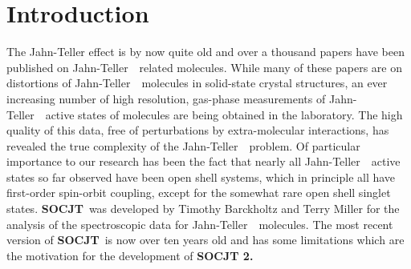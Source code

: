 \documentclass{article}
\newcommand{\JT}{Jahn-Teller\ }
\newcommand{\socjttwo}{\bf{SOCJT 2}}
\newcommand{\socjt}{{\bf SOCJT}}
\newcommand{\socrt}{{\bf SOCRT}}
\newcommand{\etoe}{{\bf e2e}}
\begin{document}
\begin{comment}
The following files are included in the distribution file {\tt
  socjt.zip}: 
\begin{description}
\item[{\tt socjt.exe}] Executable file for the main program,
  \socjt, to be run from a MS-DOS prompt.
\item[{\tt socrt.exe}] Executable file for the Renner-Teller
  version, \socrt .
\item[{\tt e2e.exe}] Executable file for the calculation of
  electronic transition intensities from one \JT\ active state to
  another.
\item[{\tt pi2pi.exe}] Executable file for the calculation of
  electronic transition intensities from one Renner-Teller active
  state to another. This file is not yet available.
\item[{\tt inputasst.exe}] Executable file that creates an input
  file for {\tt socjt.exe } based on the answers to a series of
  questions.
\item[{\tt test1}] Plain text input file to test \socjt.
\item[{\tt test2}] Plain text input file to test \socjt. The output
  of the files {\tt test1} and {\tt test2} can be used as input for
  \etoe .
\item[{\tt rt\_test}] Plain text input file to test \socrt .
\item[{\tt e2e\_test}] Plain text input file to test \etoe .
\item[{\tt manual.tex, manual.ps, and manual.pdf}] The users guide for
  the suite of programs. 
\item[{\tt output.zip}] All of the output files that are generated by
  running the test files. 
\end{description}
\end{comment}

\newpage

\section{Introduction} \label{section:intro}

The Jahn-Teller effect is by now quite old and over a thousand papers
have been published on \JT\ related molecules.  While many of these
papers are on distortions of \JT\ molecules in solid-state crystal
structures, an ever increasing number of high resolution, gas-phase
measurements of \JT\ active states of molecules are being obtained in
the laboratory. The high quality of this data, free of perturbations
by extra-molecular interactions, has revealed the true complexity of
the \JT\ problem. Of particular importance to our research has been
the fact that nearly all \JT\ active states so far observed have been
open shell systems, which in principle all have first-order
spin-orbit coupling, except for the somewhat rare open shell singlet
states. \socjt\ was developed by Timothy Barckholtz and Terry Miller for the analysis of the spectroscopic data for \JT\ molecules. The most recent version of \socjt\ is now over ten years old and has some limitations which are the motivation for the development of \socjttwo.
\end{document}
